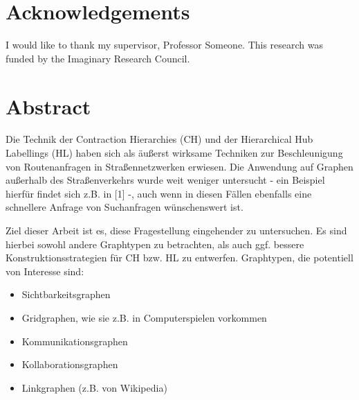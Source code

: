 \tableofcontents
\listoffigures
\listoftables

\chapter{Acknowledgements}

I would like to thank my supervisor, Professor Someone. This
research was funded by the Imaginary Research Council.

\chapter{Abstract}
Die Technik der Contraction Hierarchies (CH) und der Hierarchical Hub Labellings (HL) haben sich als äußerst wirksame Techniken zur Beschleunigung von Routenanfragen in Straßennetzwerken erwiesen. Die Anwendung auf Graphen außerhalb des Straßenverkehrs wurde weit weniger untersucht - ein Beispiel hierfür findet sich z.B. in [1] -, auch wenn in diesen Fällen ebenfalls eine schnellere Anfrage von Suchanfragen wünschenswert ist.

Ziel dieser Arbeit ist es, diese Fragestellung eingehender zu untersuchen. Es sind hierbei sowohl andere Graphtypen zu betrachten, als auch ggf. bessere Konstruktionsstrategien für CH bzw. HL zu entwerfen. Graphtypen, die potentiell von Interesse sind:

\begin{itemize}
    \item
          Sichtbarkeitsgraphen
    \item
          Gridgraphen, wie sie z.B. in Computerspielen vorkommen
    \item
          Kommunikationsgraphen
    \item
          Kollaborationsgraphen
    \item
          Linkgraphen (z.B. von Wikipedia)
\end{itemize}